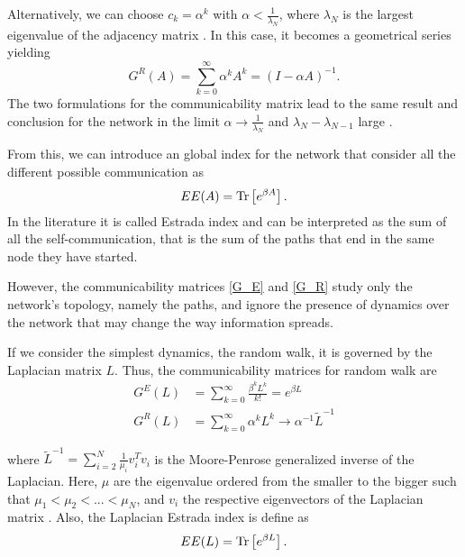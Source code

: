 Alternatively, we can choose $c_k = \alpha^{k}$ with $\alpha<\frac{1}{\lambda_N}$, where $\lambda_N$ is the largest eigenvalue of the adjacency matrix \cite{Katz}. In this case, it becomes a geometrical series yielding
\begin{equation}\label{G_R}
    G^R(A) =\sum_{k=0}^{\infty} \alpha^k A^k = (I -\alpha A)^{-1}.
\end{equation}
The two formulations for the communicability matrix lead to the same result and conclusion for the network in the limit $\alpha \rightarrow \frac{1}{\lambda_N}$ and $\lambda_N -\lambda_{N-1}$ large \cite{Benzi_Klymko}.


From this, we can introduce an global index for the network that consider all the different possible communication as
\begin{equation}
    EE(A)  = \operatorname{Tr}\left[e^{\beta A}\right].
\end{equation}
In the literature it is called Estrada index \cite{Estrada_2008} and can be interpreted as the sum of all the self-communication, that is the sum of the paths that end in the same node they have started.

However, the communicability matrices \eqref{G_E} and \eqref{G_R} study only the network's topology, namely the paths, and ignore the presence of dynamics over the network that may change the way information spreads.

If we consider the simplest dynamics, the random walk, it is governed by the Laplacian matrix $L$. 
Thus, the communicability matrices for random walk are \cite{Estrada_2012}
\begin{equation}\label{Estrada indeces}
    \begin{split}
        G^E(L) &=\sum_{k=0}^{\infty} \frac{\beta^k L^k}{k!} = e^{\beta L}  \\ 
        G^R(L) &= \sum_{k=0}^{\infty} \alpha^k L^k \rightarrow \alpha^{-1} \tilde{L}^{-1}
    \end{split}
\end{equation}

where $\tilde{L}^{-1} = \sum_{i=2}^N \frac{1}{\mu_i}v_i^Tv_i$ is the Moore-Penrose generalized inverse of the Laplacian. Here, $\mu$ are the eigenvalue ordered from the smaller to the bigger such that $\mu_1 < \mu_2 < ... < \mu_N$, and $v_i$ the respective eigenvectors of the Laplacian matrix \cite{Generalized_inverse_Laplacian}.
Also, the Laplacian Estrada index is define as
\begin{equation}\label{EE_L}
    EE(L) = \operatorname{Tr}\left[e^{\beta L}\right].
\end{equation}

